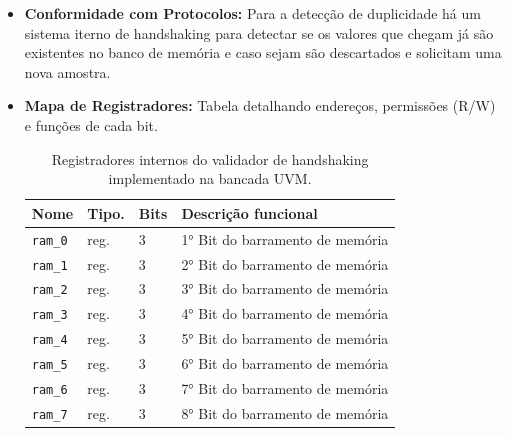 \documentclass[12pt,a4paper]{article}
\begin{document}
\begin{itemize}[leftmargin=1.4em]
		
		\item \textbf{Conformidade com Protocolos:} Para a detecção de duplicidade há um sistema iterno de handshaking para detectar se os valores que chegam já são existentes no banco de memória e caso sejam são descartados e solicitam uma nova amostra.
		
		\vspace{0.5cm}
		
		\item \textbf{Mapa de Registradores:} Tabela detalhando endereços, permissões (R/W) e funções de cada bit.
		
		\begin{table}[H]
			\centering
			\small
			\begin{tabularx}{\textwidth}{|M{3.0cm}|M{1.2cm}|M{1.4cm}|Y|}
				\hline
				
				\textbf{Nome} & \textbf{Tipo.} & \textbf{Bits} & \textbf{Descrição funcional} \\
				
				\hline
				
				\texttt{ram\_0} & reg. & 3 & 1°  Bit do barramento de memória \\
				
				\hline
				
				\texttt{ram\_1} & reg. & 3 & 2°  Bit do barramento de memória \\
				
				\hline
				
				\texttt{ram\_2} & reg. & 3 & 3°  Bit do barramento de memória \\
				
				\hline
				
				\texttt{ram\_3} & reg. & 3 & 4°  Bit do barramento de memória \\
				
				\hline
				
				\texttt{ram\_4} & reg. & 3 & 5°  Bit do barramento de memória \\
				
				\hline
				
				\texttt{ram\_5} & reg. & 3 & 6°  Bit do barramento de memória \\
				
				\hline
				
				\texttt{ram\_6} & reg. & 3 & 7°  Bit do barramento de memória \\
				
				\hline
				
				\texttt{ram\_7} & reg. & 3 & 8°  Bit do barramento de memória \\
				
				\hline
				
			\end{tabularx}
			
			\caption{Registradores internos do validador de handshaking implementado na bancada UVM.}
		\end{table}
		
	\end{itemize}
	
\end{document}
